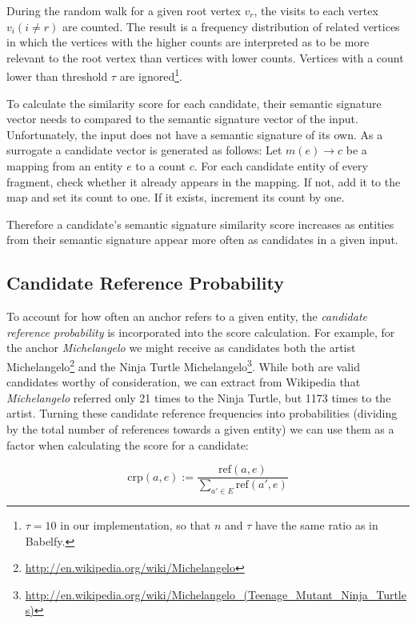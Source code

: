 \documentclass[runningheads,a4paper]{llncs}
\begin{document}
{During the random walk for a given root vertex $v_r$, the visits to each vertex $v_i (i \neq r)$ are counted. The result is a frequency distribution of related vertices in which the vertices with the higher counts are interpreted as to be more relevant to the root vertex than vertices with lower counts. Vertices with a count lower than threshold $\tau$ are ignored\footnote{$\tau = 10$ in our implementation, so that $n$ and $\tau$ have the same ratio as in Babelfy.}.

To calculate the similarity score for each candidate, their semantic signature vector needs to compared to the semantic signature vector of the input. Unfortunately, the input does not have a semantic signature of its own. As a surrogate a candidate vector is generated as follows: Let $m(e) \rightarrow c$ be a mapping from an entity $e$ to a count $c$. For each candidate entity of every fragment, check whether it already appears in the mapping. If not, add it to the map and set its count to one. If it exists, increment its count by one.

Therefore a candidate's semantic signature similarity score increases as entities from their semantic signature appear more often as candidates in a given input.

\subsection{Candidate Reference Probability}

To account for how often an anchor refers to a given entity, the \emph{candidate reference probability} is incorporated into the score calculation. For example, for the anchor \textit{Michelangelo} we might receive as candidates both the artist Michelangelo\footnote{\url{http://en.wikipedia.org/wiki/Michelangelo}} and the Ninja Turtle Michelangelo\footnote{\url{http://en.wikipedia.org/wiki/Michelangelo_(Teenage_Mutant_Ninja_Turtles)}}. While both are valid candidates worthy of consideration, we can extract from Wikipedia that \textit{Michelangelo} referred only 21 times to the Ninja Turtle, but 1173 times to the artist. Turning these candidate reference frequencies into probabilities (dividing by the total number of references towards a given entity) we can use them as a factor when calculating the score for a candidate:

$$\mathrm{crp}(a, e) := \frac{\mathrm{ref}(a, e)}{{\sum\limits_{a'\in E} \mathrm{ref}(a', e)}}$$

}
\end{document}
